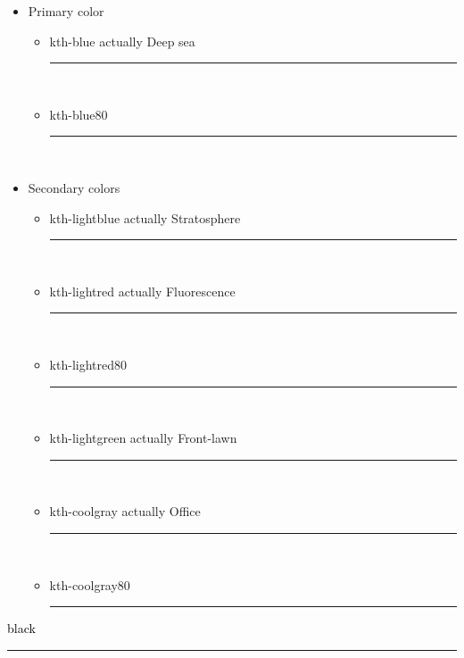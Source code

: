 \documentclass[english, bibtex]{kththesis}
\begin{document}
\begin{itemize}[noitemsep]
    \item Primary color
    \begin{itemize}
    \item \textcolor{kth-blue}{kth-blue \ifdigitaloutput
    actually Deep sea
    \fi} {\color{kth-blue} \rule{0.3\linewidth}{1mm} }\\

    \item \textcolor{kth-blue80}{kth-blue80} {\color{kth-blue80} \rule{0.3\linewidth}{1mm} }\\
\end{itemize}

\item  Secondary colors
\begin{itemize}[noitemsep]
    \item \textcolor{kth-lightblue}{kth-lightblue \ifdigitaloutput
    actually Stratosphere
    \fi} {\color{kth-lightblue} \rule{0.3\linewidth}{1mm} }\\

    \item \textcolor{kth-lightred}{kth-lightred \ifdigitaloutput
    actually Fluorescence\fi} {\color{kth-lightred} \rule{0.3\linewidth}{1mm} }\\

    \item \textcolor{kth-lightred80}{kth-lightred80} {\color{kth-lightred80} \rule{0.3\linewidth}{1mm} }\\

    \item \textcolor{kth-lightgreen}{kth-lightgreen \ifdigitaloutput
    actually Front-lawn\fi} {\color{kth-lightgreen} \rule{0.3\linewidth}{1mm} }\\

    \item \textcolor{kth-coolgray}{kth-coolgray \ifdigitaloutput
    actually Office\fi} {\color{kth-coolgray} \rule{0.3\linewidth}{1mm} }\\

    \item \textcolor{kth-coolgray80}{kth-coolgray80} {\color{kth-coolgray80} \rule{0.3\linewidth}{1mm} }
\end{itemize}
\end{itemize}

\textcolor{black}{black} {\color{black} \rule{\linewidth}{1mm} }

\label{pg:lastPageofMainmatter}

\clearpage
\fancyhead{}  %
\end{document}
